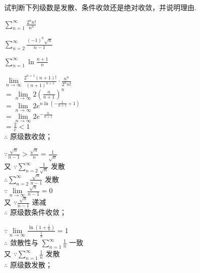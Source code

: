 \begin{problem}[points = 9]
试判断下列级数是发散、条件收敛还是绝对收敛，并说明理由.
\end{problem}
\begin{calculations}[columns = 3, label = (\arabic*)]
    \item $\sum\limits_{n = 1}^{\infty} \frac{2^nn!}{n^n}$
    \item $\sum\limits_{n = 2}^{\infty} \frac{(-1)^n\sqrt{n}}{n - 1}$
    \item $\sum\limits_{n = 1}^{\infty} \ln{\frac{n + 1}{n}}$
\end{calculations}
\begin{solution}
    \begin{calculations}[columns = 3, label = (\arabic*)]
        \item $\lim\limits_{n \to \infty} \frac{2^{n + 1}(n + 1)!}{(n + 1)^{n + 1}} \cdot \frac{n^n}{2^nn!}$ \\
        $= \lim\limits_{n \to \infty} 2 \left(\frac{n}{n + 1}\right)^n$ \\
        $= \lim\limits_{n \to \infty} 2e^{n\ln{(-\frac{1}{n + 1} + 1)}}$ \\
        $= \lim\limits_{n \to \infty} 2e^{-\frac{n}{n + 1}}$ \\
        $= \frac{2}{e} < 1$ \\
        $\therefore$ 原级数收敛；

        \item $\because \frac{\sqrt{n}}{n - 1} > \frac{\sqrt{n}}{n} = \frac{1}{\sqrt{n}}$ \\
        又 $\because \sum\limits_{n = 2}^{\infty}\frac{1}{\sqrt{n}}$ 发散 \\
        $\therefore \sum\limits_{n = 2}^{\infty}\frac{\sqrt{n}}{n - 1}$ 发散 \\
        $\because \lim\limits_{n \to \infty} \frac{\sqrt{n}}{n - 1} = 0$ \\
        又 $\because \frac{\sqrt{n}}{n - 1}$ 递减 \\
        $\therefore$ 原级数条件收敛；

        \item $\because \lim\limits_{n \to \infty} \frac{\ln{(1 + \frac{1}{n})}}{\frac{1}{n}} = 1$ \\
        $\therefore$ 敛散性与 $\sum\limits_{n = 1}^{\infty} \frac{1}{n}$ 一致 \\
        又 $\because \sum\limits_{n = 1}^{\infty} \frac{1}{n}$ 发散 \\
        $\therefore$ 原级数发散；
    \end{calculations}
\end{solution}

